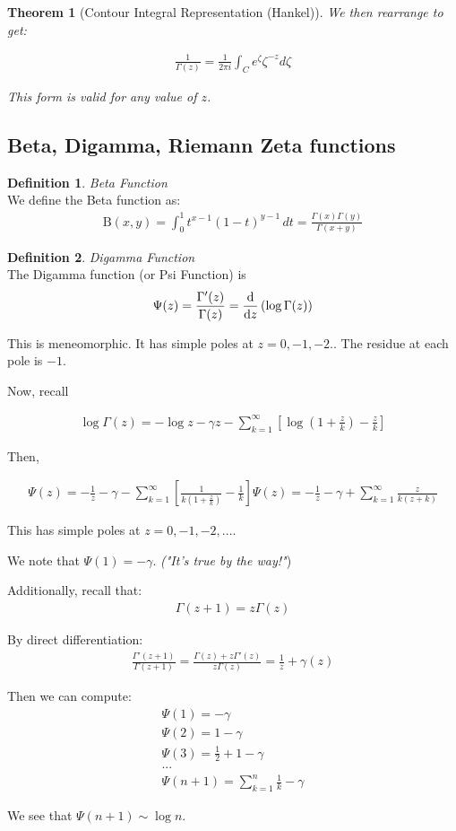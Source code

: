 \documentclass{article}
\newtheorem{theorem}{Theorem}[section]
\theoremstyle{definition}
\newtheorem{definition}{Definition}[section]
\newcommand{\Def}[2]{
\begin{shaded*}
\begin{definition}{\textit{#1}}\\#2\end{definition}
\end{shaded*}
}
\begin{document}
\begin{theorem}[Contour Integral Representation (Hankel)]
We then rearrange to get:

\begin{align*}
\frac{1}{\Gamma(z)} = \frac{1}{2\pi i } \int_{C} e^\zeta \zeta ^{-z} d\zeta 
\end{align*}

This form is valid for any value of $z$.
\end{theorem}

\subsection{Beta, Digamma, Riemann Zeta functions}

\Def{Beta Function}{
We define the Beta function as:
\begin{align*}
 \mathrm{B} (x,y)=\int _{0}^{1}t^{x-1}(1-t)^{y-1}\,dt
 = \frac{\Gamma(x)\Gamma(y)}{\Gamma(x+y)}
  \end{align*}
}

\Def{Digamma Function}{
The Digamma function (or Psi Function) is
\begin{align*}
\Psi (z) = \frac{\Gamma'(z)}{\Gamma(z)} = \dv{z} \left(\log \Gamma(z)\right)
\end{align*}

This is meneomorphic. It has simple poles at $z=0, -1, -2..$ The residue at each pole is $-1$. 

Now, recall

\begin{align*}
\log \Gamma(z) = -\log z - \gamma z - \sum_{k=1}^\infty \left[\log(1+\frac{z}{k}) - \frac{z}{k}\right]
\end{align*}

Then, 

\begin{align*}
\Psi(z) = - \frac{1}{z} - \gamma  - \sum_{k=1}^\infty \left[\frac{1}{k(1+\frac{z}{k})} - \frac{1}{k}\right]
\Psi(z) = - \frac{1}{z} - \gamma  + \sum_{k=1}^\infty \frac{z}{k(z+k)}
\end{align*}

This has simple poles at $z=0,-1,-2,...$. 

We note that $\Psi(1) = -\gamma$. \textit{("It's true by the way!"}) 

Additionally, recall that:
\begin{align*}
\Gamma(z+1) = z\Gamma(z) 
\end{align*}

By direct differentiation:
\begin{align*}
\frac{\Gamma'(z+1)}{\Gamma(z+1)} = \frac{\Gamma(z) + z \Gamma'(z)}{z \Gamma(z)} = \frac{1}{z} + \gamma(z)
\end{align*}

Then we can compute:
\begin{align*}
\Psi(1) = -\gamma\\
\Psi(2) = 1-\gamma \\ 
\Psi(3) = \frac{1}{2} + 1 - \gamma \\
...\\
\Psi(n+1) = \sum_{k=1}^{n} \frac{1}{k} - \gamma
\end{align*}

We see that $\Psi(n+1) \sim \log n$. 
}
\end{document}
